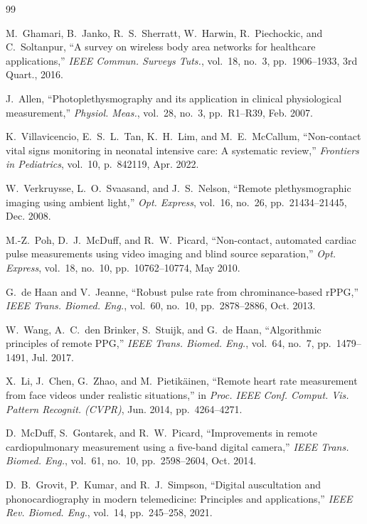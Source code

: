 \documentclass[journal]{IEEEtran}
\begin{document}
\begin{thebibliography}{99}
\fontsize{7.6pt}{8.8pt}\selectfont

M.~Ghamari, B.~Janko, R.~S.~Sherratt, W.~Harwin, R.~Piechockic, and C.~Soltanpur,
``A survey on wireless body area networks for healthcare applications,''
\emph{IEEE Commun. Surveys Tuts.}, vol.~18, no.~3, pp.~1906--1933, 3rd Quart., 2016.

J.~Allen,
``Photoplethysmography and its application in clinical physiological measurement,''
\emph{Physiol. Meas.}, vol.~28, no.~3, pp.~R1--R39, Feb. 2007.

K.~Villavicencio, E.~S.~L.~Tan, K.~H.~Lim, and M.~E.~McCallum,
``Non-contact vital signs monitoring in neonatal intensive care: A systematic review,''
\emph{Frontiers in Pediatrics}, vol.~10, p.~842119, Apr. 2022.

W.~Verkruysse, L.~O.~Svaasand, and J.~S.~Nelson,
``Remote plethysmographic imaging using ambient light,''
\emph{Opt. Express}, vol.~16, no.~26, pp.~21434--21445, Dec. 2008.

M.-Z.~Poh, D.~J.~McDuff, and R.~W.~Picard,
``Non-contact, automated cardiac pulse measurements using video imaging and blind source separation,''
\emph{Opt. Express}, vol.~18, no.~10, pp.~10762--10774, May 2010.

G.~de Haan and V.~Jeanne,
``Robust pulse rate from chrominance-based rPPG,''
\emph{IEEE Trans. Biomed. Eng.}, vol.~60, no.~10, pp.~2878--2886, Oct. 2013.

W.~Wang, A.~C.~den Brinker, S.~Stuijk, and G.~de Haan,
``Algorithmic principles of remote PPG,''
\emph{IEEE Trans. Biomed. Eng.}, vol.~64, no.~7, pp.~1479--1491, Jul. 2017.

X.~Li, J.~Chen, G.~Zhao, and M.~Pietik{\"a}inen,
``Remote heart rate measurement from face videos under realistic situations,''
in \emph{Proc. IEEE Conf. Comput. Vis. Pattern Recognit. (CVPR)}, Jun. 2014, pp.~4264--4271.

D.~McDuff, S.~Gontarek, and R.~W.~Picard,
``Improvements in remote cardiopulmonary measurement using a five-band digital camera,''
\emph{IEEE Trans. Biomed. Eng.}, vol.~61, no.~10, pp.~2598--2604, Oct. 2014.

D.~B.~Grovit, P.~Kumar, and R.~J.~Simpson,
``Digital auscultation and phonocardiography in modern telemedicine: Principles and applications,''
\emph{IEEE Rev. Biomed. Eng.}, vol.~14, pp.~245--258, 2021.


\end{thebibliography}
\end{document}
